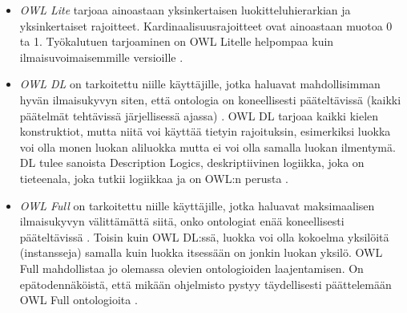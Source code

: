 \documentclass[finnish]{tktltiki2}
\theoremstyle{definition}
\theoremstyle{remark}
\begin{document}
\begin{itemize}
 \item \textit{OWL Lite} tarjoaa ainoastaan yksinkertaisen luokitteluhierarkian ja yksinkertaiset rajoitteet\cite{MH04}. Kardinaalisuusrajoitteet ovat ainoastaan muotoa 0 ta 1. Työkalutuen tarjoaminen on OWL Litelle helpompaa kuin ilmaisuvoimaisemmille versioille \cite{MH04}.  
 \item \textit{OWL DL} on tarkoitettu niille käyttäjille, jotka haluavat mahdollisimman hyvän ilmaisukyvyn siten, että ontologia on koneellisesti pääteltävissä (kaikki päätelmät tehtävissä järjellisessä ajassa) \cite{MH04}. OWL DL tarjoaa kaikki kielen konstruktiot, mutta niitä voi käyttää tietyin rajoituksin, esimerkiksi luokka voi olla monen luokan aliluokka mutta ei voi olla samalla luokan ilmentymä. DL tulee sanoista Description Logics, deskriptiivinen logiikka, joka on tieteenala, joka tutkii logiikkaa ja on OWL:n perusta \cite{MH04}.  
 \item \textit{OWL Full} on tarkoitettu niille käyttäjille, jotka haluavat maksimaalisen ilmaisukyvyn välittämättä siitä, onko ontologiat enää koneellisesti pääteltävissä \cite{MH04}. Toisin kuin OWL DL:ssä, luokka voi olla kokoelma yksilöitä (instansseja) samalla kuin luokka itsessään on jonkin luokan yksilö. OWL Full mahdollistaa jo olemassa olevien ontologioiden laajentamisen. On epätodennäköistä, että mikään ohjelmisto pystyy täydellisesti päättelemään OWL Full ontologioita \cite{MH04}. 
\end{itemize}
\end{document}
